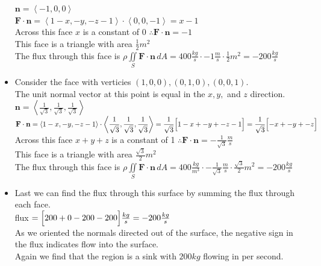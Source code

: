 \documentclass[10pt]{article}
\begin{document}
\begin{itemize}
    \subitem $ \displaystyle \textbf{n} = \left< -1,0,0 \right> $ \\
    \subitem $ \displaystyle \textbf{F} \cdot \textbf{n} = \left<1-x,-y,-z-1\right> \cdot \left< 0,0,-1 \right> = x - 1 $ \\
    \subitem Across this face $ x $ is a constant of 0 $ \therefore \textbf{F} \cdot \textbf{n} = -1 $ \\
    \subitem This face is a triangle with area $ \displaystyle \frac{1}{2}m^2 $ \\
    \subitem The flux through this face is $ \displaystyle \rho \iint \limits_{S} \textbf{F} \cdot \textbf{n} \, dA = 400\tfrac{kg}{s} \cdot -1\tfrac{m}{s} \cdot \frac{1}{2}m^2 = -200\tfrac{kg}{s} $ \\
    \item Consider the face with verticies $ (1,0,0), (0,1,0), (0,0,1) $. \\
    \subitem The unit normal vector at this point is equal in the $ x,y, $ and $ z $ direction. \\
    \subitem $ \displaystyle \textbf{n} = \left< \frac{1}{\sqrt{3}},\frac{1}{\sqrt{3}},\frac{1}{\sqrt{3}} \right> $ \\
    \subitem $ \displaystyle \textbf{F} \cdot \textbf{n} = \left<1-x,-y,-z-1\right> \cdot \left< \frac{1}{\sqrt{3}},\frac{1}{\sqrt{3}},\frac{1}{\sqrt{3}} \right> =\frac{1}{\sqrt{3}} \Bigl[ 1-x+-y+-z-1 \Bigr] =\frac{1}{\sqrt{3}} \Bigl[ -x+-y+-z \Bigr] $ \\
    \subitem Across this face $ x + y + z $ is a constant of 1 $ \therefore \textbf{F} \cdot \textbf{n} = - \frac{1}{\sqrt{3}}\tfrac{m}{s} $ \\
    \subitem This face is a triangle with area $ \displaystyle \frac{\sqrt{3}}{2}m^2 $ \\
    \subitem The flux through this face is $ \displaystyle \rho \iint \limits_{S} \textbf{F} \cdot \textbf{n} \, dA = 400\tfrac{kg}{m^3} \cdot -\frac{1}{\sqrt{3}}\tfrac{m}{s} \cdot \frac{\sqrt{3}}{2}m^2 = -200\tfrac{kg}{s} $ \\
    \item Last we can find the flux through this surface by summing the flux through each face. \\
    \subitem flux $ \displaystyle = \Bigl[200 + 0 -200 -200\Bigr]\tfrac{kg}{s} = -200\tfrac{kg}{s} $ \\
    \subitem As we oriented the normals directed out of the surface, the negative sign in the flux indicates flow into the surface. \\
    \subitem Again we find that the region is a sink with $ 200kg $ flowing in per second. \\
\end{itemize}
\end{document}
